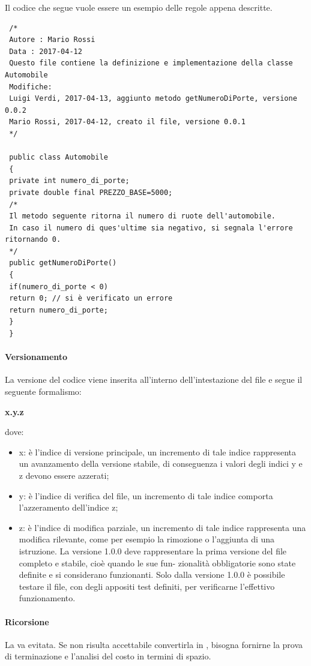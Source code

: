  Il codice che segue vuole essere un esempio delle regole appena descritte.
 \begin{verbatim}
 /* 
 Autore : Mario Rossi
 Data : 2017-04-12
 Questo file contiene la definizione e implementazione della classe Automobile
 Modifiche:
 Luigi Verdi, 2017-04-13, aggiunto metodo getNumeroDiPorte, versione 0.0.2
 Mario Rossi, 2017-04-12, creato il file, versione 0.0.1
 */
 
 public class Automobile
 {
 private int numero_di_porte;
 private double final PREZZO_BASE=5000;
 /*
 Il metodo seguente ritorna il numero di ruote dell'automobile. 
 In caso il numero di ques'ultime sia negativo, si segnala l'errore ritornando 0.
 */
 public getNumeroDiPorte()
 {
 if(numero_di_porte < 0)
 return 0; // si è verificato un errore
 return numero_di_porte;
 }
 }
 \end{verbatim}
 \newpage
 \paragraph{Versionamento}
 La versione del codice viene inserita all’interno dell’intestazione del file e segue il seguente formalismo:\\
 \centerline{\textbf{x.y.z}} dove:
  \begin{itemize}
 	\item x: è l’indice di versione principale, un incremento di tale indice rappresenta un avanzamento
 	della versione stabile, di conseguenza i valori degli indici y e z devono essere azzerati;
 	\item y: è l’indice di verifica del file, un incremento di tale indice comporta l’azzeramento
 	dell’indice z;
 	\item z: è l’indice di modifica parziale, un incremento di tale indice rappresenta una modifica
 	rilevante, come per esempio la rimozione o l’aggiunta di una istruzione. La versione 1.0.0
 	deve rappresentare la prima versione del file completo e stabile, cioè quando le sue fun-
 	zionalità obbligatorie sono state definite e si considerano funzionanti. Solo dalla versione
 	1.0.0 è possibile testare il file, con degli appositi test definiti, per verificarne l’effettivo
 	funzionamento.
 \end{itemize}
 \paragraph{Ricorsione}
 La  va evitata. Se non risulta accettabile convertirla in , bisogna fornirne la prova di terminazione e l'analisi del costo in termini di spazio.

